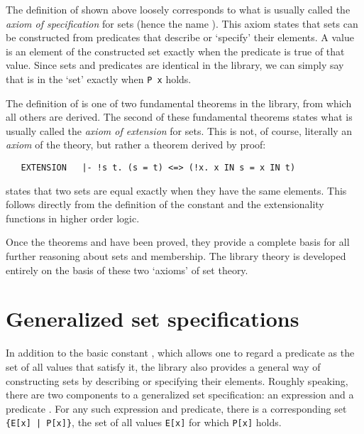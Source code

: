The definition of  shown above loosely corresponds to what is usually
called the {\it axiom of specification\/} for
sets (hence the name ). This axiom states that sets can be
constructed from predicates that describe or `specify' their elements. A value
is an element of the constructed set exactly when the predicate is true of that
value.  Since sets and predicates are identical in the  library,
we can simply say that  is in the `set'  exactly when
{\small\verb!P x!} holds.

The definition of  is one of two fundamental theorems in the
 library, from which all others are derived.  The second of
these fundamental theorems states what is usually called the {\it axiom of
extension\/} for sets.  This is not, of course,
literally an {\it axiom\/} of the  theory, but rather a theorem
derived by proof:

\begin{hol}
\begin{verbatim}
   EXTENSION   |- !s t. (s = t) <=> (!x. x IN s = x IN t)
\end{verbatim}\end{hol}

\noindent {} states that two sets are equal exactly when they have
the same elements.  This follows directly from the definition of the constant
 and the extensionality functions in higher order logic.

Once the theorems  and  have been proved, they
provide a complete basis for all further reasoning about sets and membership.
The library theory  is developed entirely on the basis of these
two `axioms' of set theory.

\section{Generalized set specifications}

In addition to the basic constant , which allows one to regard a
predicate as the set of all values that satisfy it, the  library
also provides a general way of constructing sets by describing or specifying
their elements.  Roughly speaking, there are two components to a generalized
set specification: an expression  and a predicate . For any
such expression and predicate, there is a corresponding set
{\small\verb!{E[x] | P[x]}!}, the set of all values {\small\verb!E[x]!} for
which {\small\verb!P[x]!} holds.

